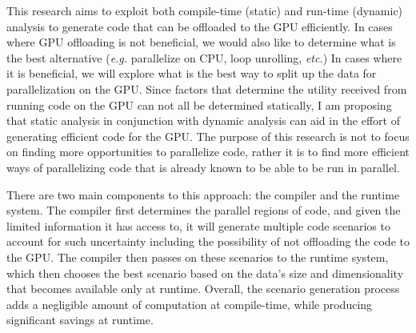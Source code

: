 \documentclass[a4paper,12pt]{article}
\begin{document}
This research aims to exploit both compile-time (static) and run-time (dynamic) analysis to generate code that can be offloaded to the GPU efficiently. In cases where GPU offloading is not beneficial, we would also like to determine what is the best alternative (\emph{e.g.} parallelize on CPU, loop unrolling, \emph{etc.}) In cases where it is beneficial, we will explore what is the best way to split up the data for parallelization on the GPU.  Since factors that determine the utility received from running code on the GPU can not all be determined statically, I am proposing that static analysis in conjunction with dynamic analysis can aid in the effort of generating efficient code for the GPU. The purpose of this research is not to focus on finding more opportunities to parallelize code, rather it is to find more efficient ways of parallelizing code that is already known to be able to be run in parallel. 

There are two main components to this approach: the compiler and the runtime system. The compiler first determines the parallel regions of code, and given the limited information it has access to, it will generate multiple code scenarios to account for such uncertainty including the possibility of not offloading the code to the GPU. The compiler then passes on these scenarios to the runtime system, which then chooses the best scenario based on the data's size and dimensionality that becomes available only at runtime. Overall, the scenario generation process adds a negligible amount of computation at compile-time, while producing significant savings at runtime. 



\end{document}
